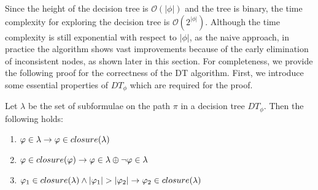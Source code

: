 Since the height of the decision tree is $\mathcal{O}(|\phi|)$ and the tree is binary, the time complexity for exploring the decision tree is $\mathcal{O}(2^{|\phi|})$. Although the time complexity is still exponential with respect to $|\phi|$, as the naive approach, in practice the algorithm shows vast improvements because of the early elimination of inconsistent nodes, as shown later in this section. For completeness, we provide the following proof for the correctness of the DT algorithm. First, we introduce some essential properties of $DT_\phi$ which are required for the proof.

\begin{definition}
\label{def:dt-props}
Let $\lambda$ be the set of subformulae on the path $\pi$ in a decision tree $DT_\phi$. Then the following holds:
\begin{enumerate}[label=(\alph*)]
    \item \label{def:dt-prop1} $\varphi \in \lambda \rightarrow \varphi \in closure(\lambda)$
    \item \label{def:dt-prop2} $\varphi \in closure(\varphi) \rightarrow \varphi \in \lambda \oplus \lnot \varphi \in \lambda$
    \item \label{def:dt-prop3} $\varphi_1 \in closure(\lambda) \land |\varphi_1| > |\varphi_2| \rightarrow \varphi_2 \in closure(\lambda)$
\end{enumerate}
\end{definition}

